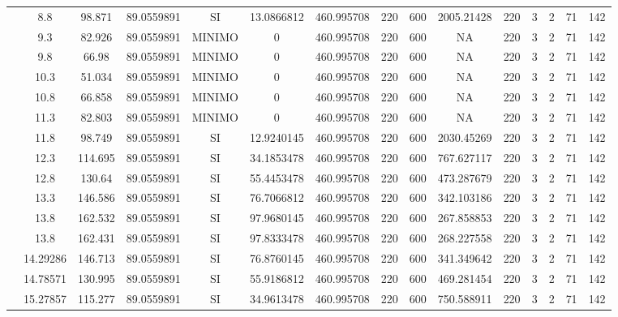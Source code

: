 \begin{table}[H]
{\begin{tabular}{|c|c|c|c|c|c|c|c|c|c|c|c|c|c|c|}
\cline{2-15}    & 8.8 & 98.871 & 89.0559891 & SI  & 13.0866812 & 460.995708 & 220 & 600 & 2005.21428 & 220 & 3   & 2   & 71  & 142 \bigstrut\\
\cline{2-15}    & 9.3 & 82.926 & 89.0559891 & MINIMO & 0   & 460.995708 & 220 & 600 & NA  & 220 & 3   & 2   & 71  & 142 \bigstrut\\
\cline{2-15}    & 9.8 & 66.98 & 89.0559891 & MINIMO & 0   & 460.995708 & 220 & 600 & NA  & 220 & 3   & 2   & 71  & 142 \bigstrut\\
\cline{2-15}    & 10.3 & 51.034 & 89.0559891 & MINIMO & 0   & 460.995708 & 220 & 600 & NA  & 220 & 3   & 2   & 71  & 142 \bigstrut\\
\cline{2-15}    & 10.8 & 66.858 & 89.0559891 & MINIMO & 0   & 460.995708 & 220 & 600 & NA  & 220 & 3   & 2   & 71  & 142 \bigstrut\\
\cline{2-15}    & 11.3 & 82.803 & 89.0559891 & MINIMO & 0   & 460.995708 & 220 & 600 & NA  & 220 & 3   & 2   & 71  & 142 \bigstrut\\
\cline{2-15}    & 11.8 & 98.749 & 89.0559891 & SI  & 12.9240145 & 460.995708 & 220 & 600 & 2030.45269 & 220 & 3   & 2   & 71  & 142 \bigstrut\\
\cline{2-15}    & 12.3 & 114.695 & 89.0559891 & SI  & 34.1853478 & 460.995708 & 220 & 600 & 767.627117 & 220 & 3   & 2   & 71  & 142 \bigstrut\\
\cline{2-15}    & 12.8 & 130.64 & 89.0559891 & SI  & 55.4453478 & 460.995708 & 220 & 600 & 473.287679 & 220 & 3   & 2   & 71  & 142 \bigstrut\\
\cline{2-15}    & 13.3 & 146.586 & 89.0559891 & SI  & 76.7066812 & 460.995708 & 220 & 600 & 342.103186 & 220 & 3   & 2   & 71  & 142 \bigstrut\\
\cline{2-15}    & 13.8 & 162.532 & 89.0559891 & SI  & 97.9680145 & 460.995708 & 220 & 600 & 267.858853 & 220 & 3   & 2   & 71  & 142 \bigstrut\\
\cline{2-15}    & 13.8 & 162.431 & 89.0559891 & SI  & 97.8333478 & 460.995708 & 220 & 600 & 268.227558 & 220 & 3   & 2   & 71  & 142 \bigstrut\\
\cline{2-15}    & 14.29286 & 146.713 & 89.0559891 & SI  & 76.8760145 & 460.995708 & 220 & 600 & 341.349642 & 220 & 3   & 2   & 71  & 142 \bigstrut\\
\cline{2-15}    & 14.78571 & 130.995 & 89.0559891 & SI  & 55.9186812 & 460.995708 & 220 & 600 & 469.281454 & 220 & 3   & 2   & 71  & 142 \bigstrut\\
\cline{2-15}    & 15.27857 & 115.277 & 89.0559891 & SI  & 34.9613478 & 460.995708 & 220 & 600 & 750.588911 & 220 & 3   & 2   & 71  & 142 \bigstrut\\

\end{tabular}}
\end{table}
